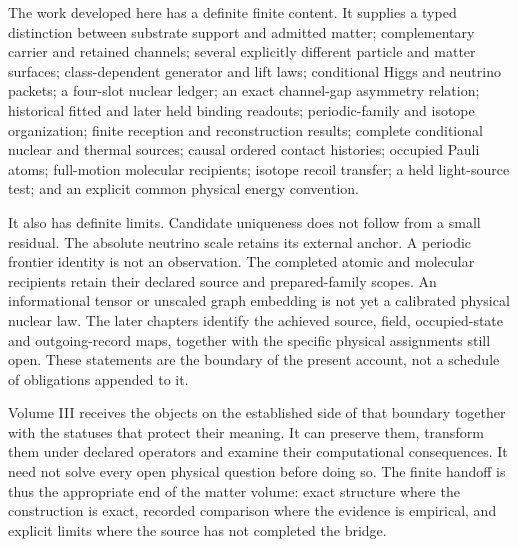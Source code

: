 The work developed here has a definite finite content. It supplies a typed distinction between substrate support and admitted matter; complementary carrier and retained channels; several explicitly different particle and matter surfaces; class-dependent generator and lift laws; conditional Higgs and neutrino packets; a four-slot nuclear ledger; an exact channel-gap asymmetry relation; historical fitted and later held binding readouts; periodic-family and isotope organization; finite reception and reconstruction results; complete conditional nuclear and thermal sources; causal ordered contact histories; occupied Pauli atoms; full-motion molecular recipients; isotope recoil transfer; a held light-source test; and an explicit common physical energy convention.

It also has definite limits. Candidate uniqueness does not follow from a small residual. The absolute neutrino scale retains its external anchor. A periodic frontier identity is not an observation. The completed atomic and molecular recipients retain their declared source and prepared-family scopes. An informational tensor or unscaled graph embedding is not yet a calibrated physical nuclear law. The later chapters identify the achieved source, field, occupied-state and outgoing-record maps, together with the specific physical assignments still open. These statements are the boundary of the present account, not a schedule of obligations appended to it.

Volume III receives the objects on the established side of that boundary together with the statuses that protect their meaning. It can preserve them, transform them under declared operators and examine their computational consequences. It need not solve every open physical question before doing so. The finite handoff is thus the appropriate end of the matter volume: exact structure where the construction is exact, recorded comparison where the evidence is empirical, and explicit limits where the source has not completed the bridge.
